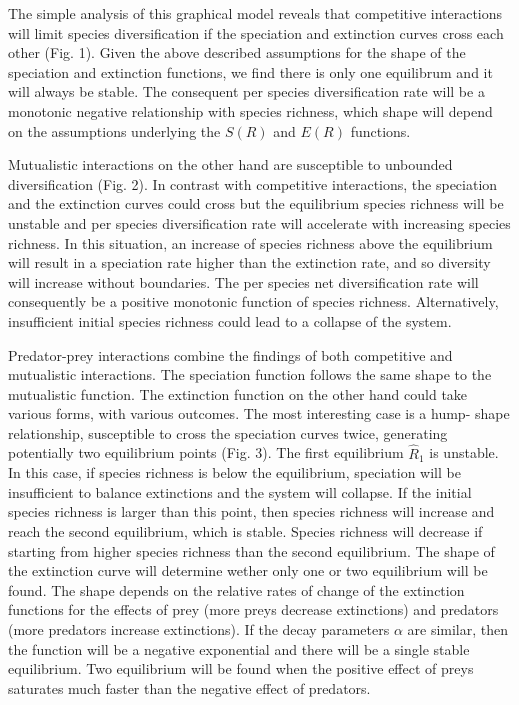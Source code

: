 \documentclass[12pt]{article}
\begin{document}
The simple analysis of this graphical model reveals that competitive
interactions will limit species diversification if the speciation and
extinction curves cross each other (Fig. 1). Given the above described
assumptions for the shape of the speciation and extinction functions, we find
there is only one equilibrum and it will always be stable. The consequent per
species diversification rate will be a monotonic negative relationship with
species richness, which shape will depend on the assumptions underlying the
$S(R)$ and $E(R)$ functions.

Mutualistic interactions on the other hand are susceptible to unbounded
diversification (Fig. 2). In contrast with competitive interactions, the
speciation and the extinction curves could cross but the equilibrium species
richness will be unstable and per species diversification rate will accelerate
with increasing species richness. In this situation, an increase of species
richness above the equilibrium will result in a speciation rate higher than
the extinction rate, and so diversity will increase without boundaries. The
per species net diversification rate will consequently be a positive monotonic
function of species richness. Alternatively, insufficient initial species
richness could lead to a collapse of the system.

Predator-prey interactions combine the findings of both competitive and
mutualistic interactions. The speciation function follows the same shape to
the mutualistic function. The extinction function on the other hand could take
various forms, with various outcomes. The most interesting case is a hump-
shape relationship, susceptible to cross the speciation curves twice,
generating potentially two equilibrium points (Fig. 3). The first equilibrium
$\hat{R}_1$ is unstable. In this case, if species richness is below the
equilibrium, speciation will be insufficient to balance extinctions and the
system will collapse. If the initial species richness is larger than this
point, then species richness will increase and reach the second equilibrium,
which is stable. Species richness will decrease if starting from higher
species richness than the second equilibrium. The shape of the extinction
curve will determine wether only one or two equilibrium will be found. The
shape depends on the relative rates of change of the extinction functions for
the effects of prey (more preys decrease extinctions) and predators (more
predators increase extinctions). If the decay parameters $\alpha$ are similar,
then the function will be a negative exponential and there will be a single
stable equilibrium. Two equilibrium will be found when the positive effect of
preys saturates much faster than the negative effect of predators.
\end{document}
